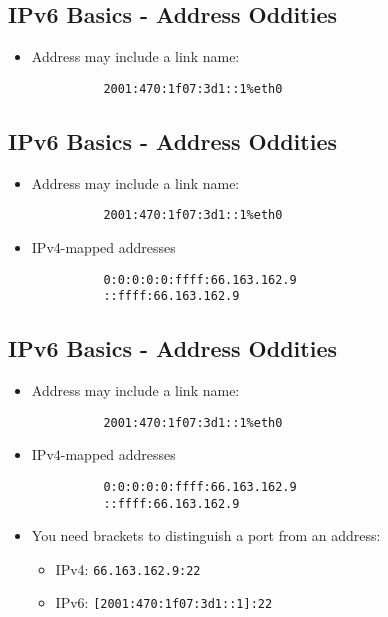 \documentclass[xga]{xdvislides}
\begin{document}
\subsection{IPv6 Basics - Address Oddities}
\begin{itemize}
	\item Address may include a link name:
\begin{verbatim}
          2001:470:1f07:3d1::1%eth0
\end{verbatim}
\end{itemize}

\subsection{IPv6 Basics - Address Oddities}
\begin{itemize}
	\item Address may include a link name:
\begin{verbatim}
          2001:470:1f07:3d1::1%eth0
\end{verbatim}
	\item IPv4-mapped addresses
\begin{verbatim}
          0:0:0:0:0:ffff:66.163.162.9
          ::ffff:66.163.162.9
\end{verbatim}
\end{itemize}

\subsection{IPv6 Basics - Address Oddities}
\begin{itemize}
	\item Address may include a link name:
\begin{verbatim}
          2001:470:1f07:3d1::1%eth0
\end{verbatim}
	\item IPv4-mapped addresses
\begin{verbatim}
          0:0:0:0:0:ffff:66.163.162.9
          ::ffff:66.163.162.9
\end{verbatim}
	\item You need brackets to distinguish a port from an address:
		\begin{itemize}
			\item IPv4: \verb+66.163.162.9:22+
			\item IPv6: \verb+[2001:470:1f07:3d1::1]:22+
		\end{itemize}
\end{itemize}
\end{document}
